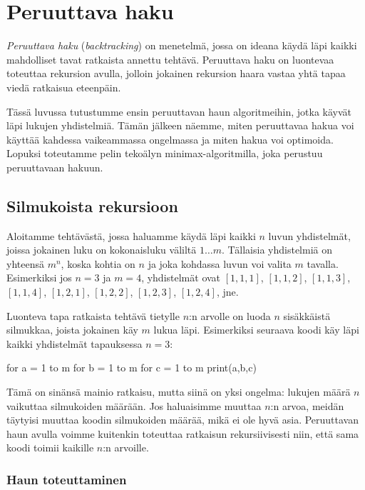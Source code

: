 \chapter{Peruuttava haku}

\emph{Peruuttava haku} (\emph{backtracking}) on menetelmä,
jossa on ideana käydä läpi kaikki mahdolliset tavat 
ratkaista annettu tehtävä.
Peruuttava haku on luontevaa toteuttaa rekursion avulla,
jolloin jokainen rekursion haara vastaa yhtä tapaa
viedä ratkaisua eteenpäin.

Tässä luvussa tutustumme ensin peruuttavan haun algoritmeihin,
jotka käyvät läpi lukujen yhdistelmiä.
Tämän jälkeen näemme, miten peruuttavaa hakua voi käyttää
kahdessa vaikeammassa ongelmassa ja miten hakua voi optimoida.
Lopuksi toteutamme pelin tekoälyn minimax-algoritmilla,
joka perustuu peruuttavaan hakuun.

\section{Silmukoista rekursioon}

Aloitamme tehtävästä,
jossa haluamme käydä läpi kaikki $n$ luvun yhdistelmät,
joissa jokainen luku on kokonaisluku väliltä $1 \dots m$.
Tällaisia yhdistelmiä on yhteensä $m^n$,
koska kohtia on $n$ ja joka kohdassa luvun voi valita $m$ tavalla.
Esimerkiksi jos $n=3$ ja $m=4$, yhdistelmät ovat
$[1,1,1]$, $[1,1,2]$, $[1,1,3]$, $[1,1,4]$, $[1,2,1]$,
$[1,2,2]$, $[1,2,3]$, $[1,2,4]$, jne.

Luonteva tapa ratkaista tehtävä tietylle $n$:n arvolle on
luoda $n$ sisäkkäistä silmukkaa, joista jokainen käy $m$ lukua läpi.
Esimerkiksi seuraava koodi käy läpi kaikki yhdistelmät
tapauksessa $n=3$:

\begin{code}
for a = 1 to m
    for b = 1 to m
        for c = 1 to m
            print(a,b,c)
\end{code}

Tämä on sinänsä mainio ratkaisu, mutta siinä on yksi ongelma:
lukujen määrä $n$ vaikuttaa silmukoiden määrään.
Jos haluaisimme muuttaa $n$:n arvoa, meidän täytyisi muuttaa
koodin silmukoiden määrää, mikä ei ole hyvä asia.
Peruuttavan haun avulla voimme kuitenkin toteuttaa ratkaisun
rekursiivisesti niin, että sama koodi toimii kaikille $n$:n arvoille.

\subsection{Haun toteuttaminen}

